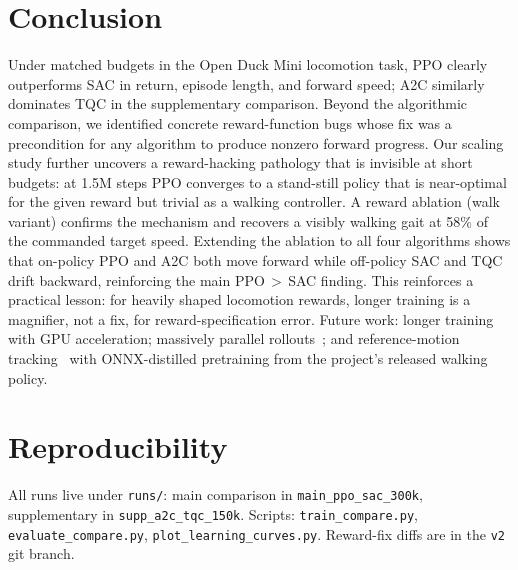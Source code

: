 \documentclass[letterpaper]{article}
\begin{document}
\section{Conclusion}
Under matched budgets in the Open Duck Mini locomotion task, PPO clearly outperforms SAC in return, episode length, and forward speed; A2C similarly dominates TQC in the supplementary comparison. Beyond the algorithmic comparison, we identified concrete reward-function bugs whose fix was a precondition for any algorithm to produce nonzero forward progress. Our scaling study further uncovers a reward-hacking pathology that is invisible at short budgets: at 1.5M steps PPO converges to a stand-still policy that is near-optimal for the given reward but trivial as a walking controller. A reward ablation (walk variant) confirms the mechanism and recovers a visibly walking gait at 58\% of the commanded target speed. Extending the ablation to all four algorithms shows that on-policy PPO and A2C both move forward while off-policy SAC and TQC drift backward, reinforcing the main PPO\,$>$\,SAC finding. This reinforces a practical lesson: for heavily shaped locomotion rewards, longer training is a magnifier, not a fix, for reward-specification error. Future work: longer training with GPU acceleration; massively parallel rollouts~\citep{rudin2022legged}; and reference-motion tracking~\citep{peng2018deepmimic} with ONNX-distilled pretraining from the project's released walking policy.

\section{Reproducibility}
All runs live under
\texttt{runs/}: main comparison in
\texttt{main\_ppo\_sac\_300k}, supplementary in
\texttt{supp\_a2c\_tqc\_150k}. Scripts: \texttt{train\_compare.py}, \texttt{evaluate\_compare.py}, \texttt{plot\_learning\_curves.py}. Reward-fix diffs are in the \texttt{v2} git branch.


\end{document}
